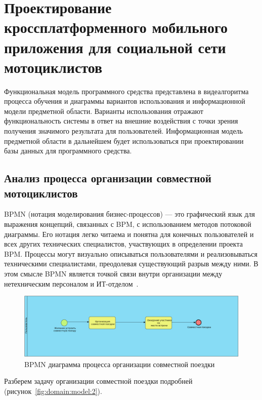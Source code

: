 \section{Проектирование кроссплатформенного мобильного приложения для социальной сети мотоциклистов}
\label{sec:domain}

Функциональная модель программного средства представлена в виде алгоритма процесса обучения и диаграммы вариантов использования и информационной модели предметной области. Варианты использования отражают функциональность системы в ответ на внешние воздействия с точки зрения получения значимого результата для пользователей. Информационная модель предметной области в дальнейшем будет использоваться при проектировании базы данных для программного средства.

\subsection{Анализ процесса организации совместной мотоциклистов} 
\label{sec:domain:model:deeds}

BPMN (нотация моделирования бизнес-процессов) --- это графический язык для выражения концепций, связанных с BPM, с использованием методов потоковой диаграммы.
Его нотация легко читаема и понятна для конечных пользователей и всех других технических специалистов, участвующих в определении проекта BPM. Процессы могут визуально описываться пользователями и реализовываться техническими специалистами, преодолевая существующий разрыв между ними. В этом смысле BPMN является точкой связи внутри организации между нетехническим персоналом и ИТ-отделом~\cite{bpmn}.

\begin{figure}[H]
	\centering
		\includegraphics[scale=0.32]{2process-1.png}
		\caption{BPMN диаграмма процесса организации совместной поездки}
		\label{fig:domain:model:1}
	\end{figure}

Разберем задачу организации совместной поездки подробней (рисунок~\ref{fig:domain:model:2}). 

